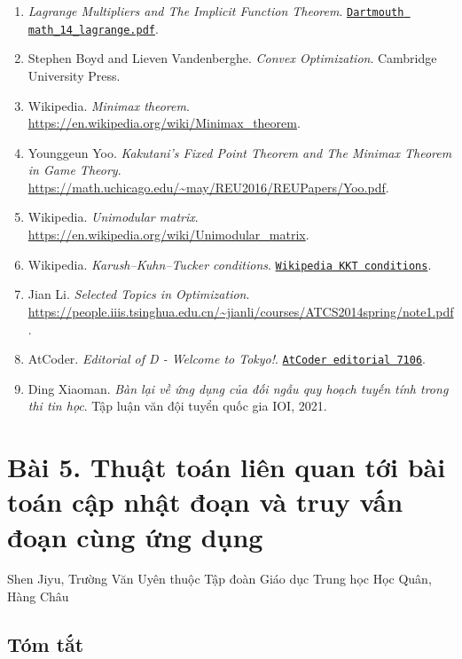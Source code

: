 \documentclass[11pt]{article}
\begin{document}
\begin{enumerate}
  \item \emph{Lagrange Multipliers and The Implicit Function Theorem}.
  \href{https://math.dartmouth.edu/archive/m14f04/public_html/math_14_lagrange.pdf}{\texttt{Dartmouth math\_14\_lagrange.pdf}}.
  \item Stephen Boyd and Lieven Vandenberghe. \emph{Convex Optimization}.
  Cambridge University Press.
  \item Wikipedia. \emph{Minimax theorem}.
  \url{https://en.wikipedia.org/wiki/Minimax_theorem}.
  \item Younggeun Yoo. \emph{Kakutani's Fixed Point Theorem and The Minimax
  Theorem in Game Theory}.
  \url{https://math.uchicago.edu/~may/REU2016/REUPapers/Yoo.pdf}.
  \item Wikipedia. \emph{Unimodular matrix}.
  \url{https://en.wikipedia.org/wiki/Unimodular_matrix}.
  \item Wikipedia. \emph{Karush--Kuhn--Tucker conditions}.
  \href{https://en.wikipedia.org/wiki/Karush-Kuhn-Tucker_conditions}{\texttt{Wikipedia KKT conditions}}.
  \item Jian Li. \emph{Selected Topics in Optimization}.
  \url{https://people.iiis.tsinghua.edu.cn/~jianli/courses/ATCS2014spring/note1.pdf}.
  \item AtCoder. \emph{Editorial of D - Welcome to Tokyo!}.
  \href{https://atcoder.jp/contests/wtf22-day1-open/editorial/7106}{\texttt{AtCoder editorial 7106}}.
  \item Ding Xiaoman. \emph{Bàn lại về ứng dụng của đối ngẫu quy hoạch tuyến
  tính trong thi tin học}. Tập luận văn đội tuyển quốc gia IOI, 2021.
\end{enumerate}

\section*{Bài 5. Thuật toán liên quan tới bài toán cập nhật đoạn và truy vấn đoạn cùng ứng dụng}

\begin{center}
Shen Jiyu, Trường Văn Uyên thuộc Tập đoàn Giáo dục Trung học Học Quân,
Hàng Châu
\end{center}

\subsection*{Tóm tắt}
\end{document}
